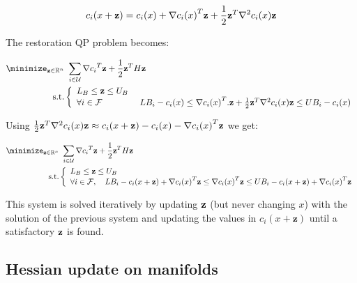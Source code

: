 \begin{equation}
  c_i(x+{\bf z}) = c_i(x) + {\nabla c_i(x)}^T {\bf z} + \frac{1}{2}{\bf z}^T{\nabla}^2c_i(x){\bf z}
\end{equation}

The restoration QP problem becomes:

\begin{align}
  \minimize_{{\bf z} \in \mathbb{R}^n} &\ \sum_{i\in \mathcal{U}} {\nabla c_i}^T{\bf z} + \frac{1}{2}{{\bf z}^T H{\bf z}} \nonumber
  \\ \text{s.t.}&
  \left\{
  \begin{array}{lr}
    { L_B \leq {\bf z} \leq U_B}\\
    \forall i \in \mathcal{F} &\ {LB_i - c_i(x)\leq {\nabla c_i(x)}^T.{\bf z} + \frac{1}{2}{\bf z}^T{\nabla}^2c_i(x){\bf z} \leq UB_i - c_i(x)}\\
  \end{array}
  \right.
\end{align}

Using $ \frac{1}{2}{\bf z}^T{\nabla}^2c_i(x){\bf z} \approx c_i(x+{\bf z}) - c_i(x) - {\nabla c_i(x)}^T {\bf z} $
we get:

\begin{align}
  \minimize_{{\bf z} \in \mathbb{R}^n} &\ \sum_{i\in \mathcal{U}} {\nabla c_i}^T{\bf z} + \frac{1}{2}{{\bf z}^T H{\bf z}} \nonumber\\
  \text{s.t.}&
  \left\{
  \begin{array}{lr}
    L_B \leq {\bf z} \leq U_B \\
    \forall i \in \mathcal{F},\quad {LB_i - c_i(x +{\bf z}) + {\nabla c_i(x)}^T{\bf z} \leq {\nabla c_i(x)}^T{\bf z} \leq UB_i - c_i(x +{\bf z}) + {\nabla c_i(x)}^T{\bf z}}\\
  \end{array}
  \right.
\end{align}

This system is solved iteratively by updating $\bf z$ (but never changing $x$) with the solution of the previous system and updating the values in $c_i(x+\mathbf{z})$ until a satisfactory $\bf z$ is found.

\subsection{Hessian update on manifolds}
\label{sub:hessian_update_on_manifolds}

